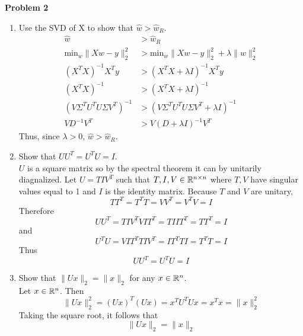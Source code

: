 {\bf Problem 2}

\begin{enumerate}
    \item 
	Use the SVD of X to show that $\widehat{w} > \widehat{w}_R$.
	\begin{align*}
	    \widehat{w} &> \widehat{w}_R \\
	    \textrm{min}_w \| Xw - y \|_2^2 &> \textrm{min}_w \| Xw - y \|_2^2 + \lambda \| w \|_2^2 \\
	    \left( X^T X \right)^{-1} X^T y &> \left( X^T X + \lambda I \right)^{-1} X^T y \\
	    \left( X^T X \right)^{-1} &> \left( X^T X + \lambda I \right)^{-1} \\
	    \left( V \Sigma^T U^T U \Sigma V^T \right)^{-1} &> \left( V \Sigma^T U^T U \Sigma V^T + \lambda I \right)^{-1} \tag*{Use SVD} \\
	    V D^{-1} V^T &> V \left( D + \lambda I \right)^{-1} V^T \tag*{V is unitary and let $\Sigma^2 = D$ s.t. $D \in \R_+^d$}
	\end{align*}
	Thus, since $\lambda > 0$, $\widehat{w} > \widehat{w}_R$.
    \item  
	Show that $U U^T = U^T U = I$. \\
	$U$ is a square matrix so by the spectral theorem it can by unitarily diagnalized.
	Let $U = TIV^T$ such that $T,I,V \in \mathbb{R}^{n \times n}$ where $T, V$ have singular values equal to 1 and $I$ is the identity matrix.
	Because $T$ and $V$ are unitary, 
	    $$ T T^T = T^T T = V V^T = V^T V = I$$
	Therefore
	    $$ U U^T = T I V^T V I T^T = T I I T^T = T T^T = I $$
	and
	    $$ U^T U = V I T^T T I V^T = I T^T T I = T^T T = I $$
	Thus 
	    $$ U U^T = U^T U = I $$
    \item
	Show that $\| Ux \|_2 = \| x \|_2$ for any $x \in \mathbb{R}^n$. \\
	Let $x \in \mathbb{R}^n$.
	Then
	    $$ \| Ux \|_2^2 = \left( Ux \right)^T \left( Ux \right) = x^T U^T U x = x^T x = \| x \|_2^2 $$
	Taking the square root, it follows that
	    $$ \| Ux \|_2 = \| x \|_2 $$	
\end{enumerate}
